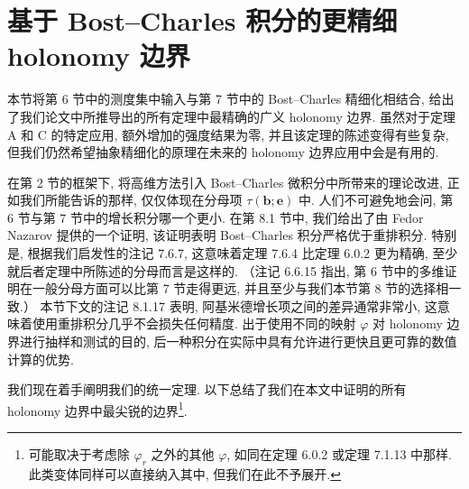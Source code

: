 \section{基于 Bost--Charles 积分的更精细 holonomy 边界}\label{sec:8}

本节将第 6 节中的测度集中输入与第 7 节中的 Bost--Charles 精细化相结合, 给出了我们论文中所推导出的所有定理中最精确的广义 holonomy 边界. 
虽然对于定理 A 和 C 的特定应用, 额外增加的强度结果为零, 并且该定理的陈述变得有些复杂, 
但我们仍然希望抽象精细化的原理在未来的 holonomy 边界应用中会是有用的.

在第 2 节的框架下, 将高维方法引入 Bost--Charles 微积分中所带来的理论改进, 
正如我们所能告诉的那样, 仅仅体现在分母项 \(\tau(\mathbf{b}; \mathbf{e})\) 中. 
人们不可避免地会问, 第 6 节与第 7 节中的增长积分哪一个更小. 
在第 8.1 节中, 我们给出了由 Fedor Nazarov 提供的一个证明, 
该证明表明 Bost--Charles 积分严格优于重排积分. 
特别是, 根据我们启发性的注记 7.6.7, 这意味着定理 7.6.4 比定理 6.0.2 更为精确, 
至少就后者定理中所陈述的分母而言是这样的. 
（注记 6.6.15 指出, 第 6 节中的多维证明在一般分母方面可以比第 7 节走得更远, 并且至少与我们本节第 8 节的选择相一致.） 
本节下文的注记 8.1.17 表明, 阿基米德增长项之间的差异通常非常小, 
这意味着使用重排积分几乎不会损失任何精度. 
出于使用不同的映射 \(\varphi\) 对 holonomy 边界进行抽样和测试的目的, 
后一种积分在实际中具有允许进行更快且更可靠的数值计算的优势.

我们现在着手阐明我们的统一定理. 
\setcounter{footnote}{31}
以下总结了我们在本文中证明的所有 holonomy 边界中最尖锐的边界\footnote{可能取决于考虑除 \(\varphi_r\) 之外的其他 \(\varphi\), 如同在定理 6.0.2 或定理 7.1.13 中那样. 
此类变体同样可以直接纳入其中, 但我们在此不予展开.}.

